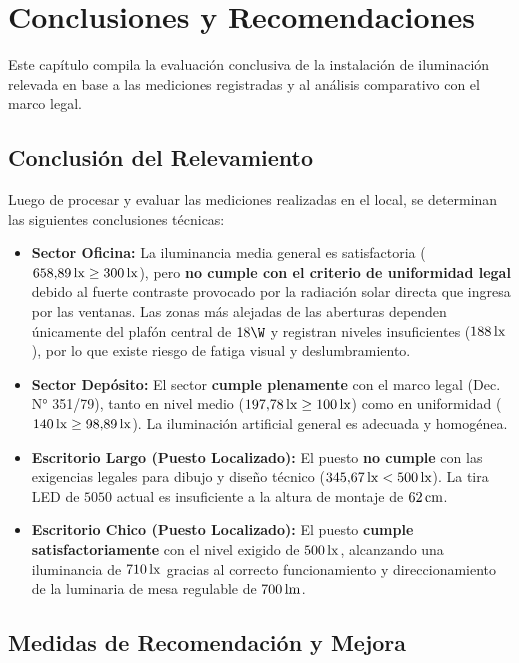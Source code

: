 \chapter{Conclusiones y Recomendaciones}
\label{sec.tp2:conclusiones}

Este capítulo compila la evaluación conclusiva de la instalación de iluminación relevada en base a las mediciones
registradas y al análisis comparativo con el marco legal.

\section{Conclusión del Relevamiento}
\label{sec.tp2:conclusion_evaluacion}

Luego de procesar y evaluar las mediciones realizadas en el local, se determinan las siguientes conclusiones técnicas:
\begin{itemize}
    \item \textbf{Sector Oficina:} La iluminancia media general es satisfactoria ($658{,}89\,\mathrm{lx} \ge 300\,\mathrm{lx}$), pero \textbf{no cumple con el criterio de uniformidad legal} debido al fuerte contraste provocado por la radiación solar directa que ingresa por las ventanas. Las zonas más alejadas de las aberturas dependen únicamente del plafón central de $18\W$ y registran niveles insuficientes ($188\,\mathrm{lx}$), por lo que existe riesgo de fatiga visual y deslumbramiento.
    \item \textbf{Sector Depósito:} El sector \textbf{cumple plenamente} con el marco legal (Dec. N° 351/79), tanto en nivel medio ($197{,}78\,\mathrm{lx} \ge 100\,\mathrm{lx}$) como en uniformidad ($140\,\mathrm{lx} \ge 98{,}89\,\mathrm{lx}$). La iluminación artificial general es adecuada y homogénea.
    \item \textbf{Escritorio Largo (Puesto Localizado):} El puesto \textbf{no cumple} con las exigencias legales para dibujo y diseño técnico ($345{,}67\,\mathrm{lx} < 500\,\mathrm{lx}$). La tira LED de $5050$ actual es insuficiente a la altura de montaje de $62\,\mathrm{cm}$.
    \item \textbf{Escritorio Chico (Puesto Localizado):} El puesto \textbf{cumple satisfactoriamente} con el nivel exigido de $500\,\mathrm{lx}$, alcanzando una iluminancia de $710\,\mathrm{lx}$ gracias al correcto funcionamiento y direccionamiento de la luminaria de mesa regulable de $700\,\mathrm{lm}$.
\end{itemize}

\section{Medidas de Recomendación y Mejora}
\label{sec.tp2:recomendaciones}

